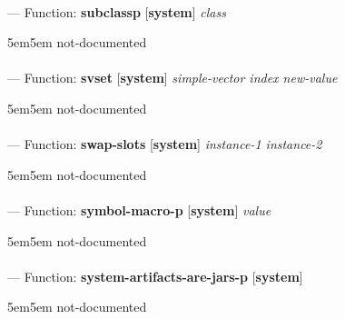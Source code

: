 \paragraph{}
\label{SYSTEM:SUBCLASSP}
--- Function: \textbf{subclassp} [\textbf{system}] \textit{class}

\begin{adjustwidth}{5em}{5em}
not-documented
\end{adjustwidth}

\paragraph{}
\label{SYSTEM:SVSET}
--- Function: \textbf{svset} [\textbf{system}] \textit{simple-vector index new-value}

\begin{adjustwidth}{5em}{5em}
not-documented
\end{adjustwidth}

\paragraph{}
\label{SYSTEM:SWAP-SLOTS}
--- Function: \textbf{swap-slots} [\textbf{system}] \textit{instance-1 instance-2}

\begin{adjustwidth}{5em}{5em}
not-documented
\end{adjustwidth}

\paragraph{}
\label{SYSTEM:SYMBOL-MACRO-P}
--- Function: \textbf{symbol-macro-p} [\textbf{system}] \textit{value}

\begin{adjustwidth}{5em}{5em}
not-documented
\end{adjustwidth}

\paragraph{}
\label{SYSTEM:SYSTEM-ARTIFACTS-ARE-JARS-P}
--- Function: \textbf{system-artifacts-are-jars-p} [\textbf{system}] \textit{}

\begin{adjustwidth}{5em}{5em}
not-documented
\end{adjustwidth}

